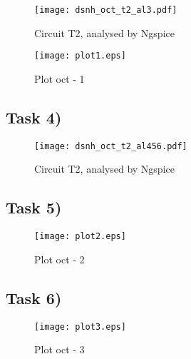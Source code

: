 \begin{figure}[ht]
	\centering
	\texttt{[image: dsnh\_oct\_t2\_al3.pdf]}
	\caption{Circuit T2, analysed by Ngspice}
\label{fig:Dsnh_sim_t2}
\end{figure}

\begin{figure}[ht]
	\centering
	\texttt{[image: plot1.eps]}
	\caption{Plot oct - 1}
\label{fig:Dsnh_sim_t2}
\end{figure}

\subsection{Task 4)}
\label{subsec:task4_a}

\begin{figure}[ht]
	\centering
	\texttt{[image: dsnh\_oct\_t2\_al456.pdf]}
	\caption{Circuit T2, analysed by Ngspice}
\label{fig:Dsnh_sim_t2}
\end{figure}

\subsection{Task 5)}
\label{subsec:task5_a}


\begin{figure}[ht]
	\centering
	\texttt{[image: plot2.eps]}
	\caption{Plot oct - 2}
\label{fig:Dsnh_sim_t2}
\end{figure}

\subsection{Task 6)}
\label{subsec:task6_a}

\begin{figure}[ht]
	\centering
	\texttt{[image: plot3.eps]}
	\caption{Plot oct - 3}
\label{fig:Dsnh_sim_t2}
\end{figure}




